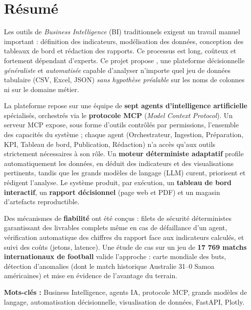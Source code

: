 \chapter*{Résumé}

Les outils de \textit{Business Intelligence} (BI) traditionnels exigent un
travail manuel important : définition des indicateurs, modélisation des
données, conception des tableaux de bord et rédaction des rapports. Ce
processus est long, coûteux et fortement dépendant d'experts. Ce projet
propose \textbf{\montitre}, une plateforme décisionnelle \emph{généraliste}
et \emph{automatisée} capable d'analyser n'importe quel jeu de données
tabulaire (CSV, Excel, JSON) \emph{sans hypothèse préalable} sur les noms de
colonnes ni sur le domaine métier.

La plateforme repose sur une équipe de \textbf{sept agents d'intelligence
artificielle} spécialisés, orchestrés via le \textbf{protocole MCP} (\textit{Model
Context Protocol}). Un serveur MCP expose, sous forme d'outils contrôlés par
permissions, l'ensemble des capacités du système ; chaque agent (Orchestrateur,
Ingestion, Préparation, KPI, Tableau de bord, Publication, Rédaction) n'a accès
qu'aux outils strictement nécessaires à son rôle. Un \textbf{moteur déterministe
adaptatif} profile automatiquement les données, en déduit des indicateurs et des
visualisations pertinents, tandis que les grands modèles de langage (LLM)
curent, priorisent et rédigent l'analyse. Le système produit, par exécution,
un \textbf{tableau de bord interactif}, un \textbf{rapport décisionnel} (page
web et PDF) et un magasin d'artefacts reproductible.

Des mécanismes de \textbf{fiabilité} ont été conçus : filets de sécurité
déterministes garantissant des livrables complets même en cas de défaillance
d'un agent, vérification automatique des chiffres du rapport face aux
indicateurs calculés, et suivi des coûts (jetons, latence). Une étude de cas
sur un jeu de \textbf{17 769 matchs internationaux de football} valide
l'approche : carte mondiale des buts, détection d'anomalies (dont le match
historique Australie 31--0 Samoa américaines) et mise en évidence de
l'avantage du terrain.

\vspace{6pt}
\noindent\textbf{Mots-clés :} Business Intelligence, agents IA, protocole MCP,
grands modèles de langage, automatisation décisionnelle, visualisation de
données, FastAPI, Plotly.

